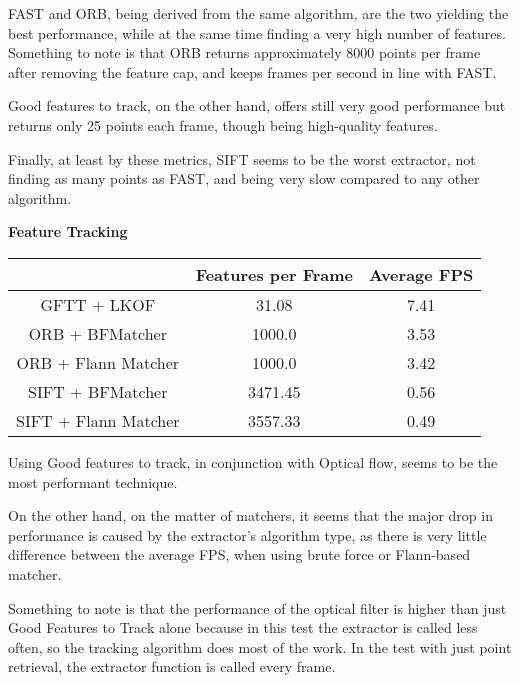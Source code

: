 \documentclass[conference]{IEEEtran}
\begin{document}
FAST and ORB, being derived from the same algorithm, are the two yielding the best performance, while at the 
same time finding a very high number of features. Something to note is that ORB returns approximately 
8000 points per frame after removing the feature cap, and keeps frames per second in line with FAST.  

Good features to track, on the other hand, offers still very good performance but returns only 
25 points each frame, though being high-quality features. 

Finally, at least by these metrics, SIFT seems to be the worst extractor, not finding as many points as FAST, 
and being very slow compared to any other algorithm.

\begin{center}
    \textbf{Feature Tracking}\\
\end{center}

\begin{center}
    \begin{tabular}{||c c c||} 
     \hline
     & Features per Frame & Average FPS \\ [0.5ex] 
     \hline\hline
     GFTT + LKOF & 31.08 & 7.41 \\ 
     \hline
     ORB + BFMatcher & 1000.0 & 3.53 \\
     \hline
     ORB + Flann Matcher & 1000.0 & 3.42 \\
     \hline
     SIFT + BFMatcher & 3471.45 & 0.56 \\
     \hline
     SIFT + Flann Matcher & 3557.33 & 0.49 \\
     \hline
    \end{tabular}
\end{center}

Using Good features to track, in conjunction with Optical flow, seems to be the most performant technique. 

On the other hand, on the matter of matchers, it seems that the major drop in performance is caused 
by the extractor's algorithm type, as there is very little difference between the average FPS, 
when using brute force or Flann-based matcher. 

Something to note is that the performance of the optical filter is higher than just Good Features to Track alone because in this test the extractor 
is called less often, so the tracking algorithm does most of the work. 
In the test with just point retrieval, the extractor function is called every frame.
\end{document}
